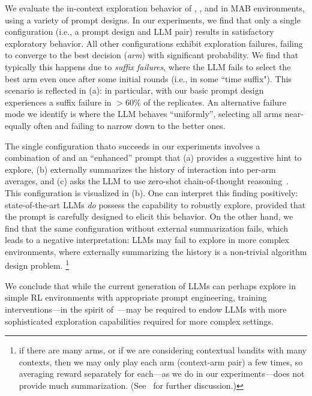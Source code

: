 We evaluate the in-context exploration behavior of \gptthree \citep{gpt3-neurips20}, \gptfour \citep{achiam2023gpt}, and \llama \citep{touvron2023llama} in MAB environments, using a variety of prompt designs.  %
In our experiments, we find that only a single configuration (i.e., a prompt design and LLM pair) results in satisfactory exploratory behavior.
All other configurations exhibit
exploration failures, failing to converge to the best decision (\emph{arm}) with significant probability.
We find that typically this happens due to \emph{suffix failures}, where the LLM fails to select the best arm even once after some initial rounds (i.e., in some ``time suffix").
This scenario is reflected in
(a): in particular, \gptfour with our basic prompt design experiences a suffix failure
in $>60\%$ of the replicates.
An alternative failure mode we identify is where the LLM behaves ``uniformly'', selecting all arms near-equally often and failing to narrow down to the better ones.

The single configuration thato succeeds in our experiments involves a
combination of \gptfour and an ``enhanced'' prompt that (a) provides a
suggestive hint to explore, (b) externally summarizes the history of
interaction into per-arm averages,
and (c) asks the LLM to use
zero-shot chain-of-thought reasoning~\citep{wei2022chain,kojima2022large}. This configuration is visualized in
(b).  One can interpret this finding
positively: state-of-the-art LLMs \emph{do} possess the capability to
robustly explore, provided that the prompt is carefully designed to
elicit this behavior. On the other hand, we find that the same
configuration without external summarization fails, which leads to a
negative interpretation: LLMs may fail to explore in more
complex environments, where externally summarizing the history is a non-trivial algorithm design problem.%
\footnote{\label{fn:summarization} \Eg if there are many arms, or if we are considering contextual bandits with many contexts, then we may only play each arm (context-arm pair) a few times, so averaging reward separately for each---as we do in our experiments---does not provide much summarization. (See~ for further discussion.)}


We conclude that while the current generation of LLMs can perhaps explore in simple RL environments with appropriate prompt engineering,
training
interventions---in the spirit
of~\citet{lee2023supervised,raparthy2023generalization}---may be
required to endow LLMs with %
more sophisticated exploration capabilities required for more complex settings.

